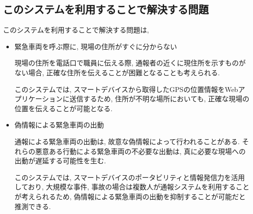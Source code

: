 \subsection{このシステムを利用することで解決する問題}
このシステムを利用することで解決する問題は,
\begin{itemize}
\item 緊急車両を呼ぶ際に, 現場の住所がすぐに分からない

現場の住所を電話口で職員に伝える際, 通報者の近くに現住所を示すものがない場合, 正確な住所を伝えることが困難となることも考えられる.

このシステムでは, スマートデバイスから取得したGPSの位置情報をWebアプリケーションに送信するため, 住所が不明な場所においても, 正確な現場の位置を伝えることが可能となる.

\item 偽情報による緊急車両の出動

通報による緊急車両の出動は, 故意な偽情報によって行われることがある.
それらの悪意ある行動による緊急車両の不必要な出動は, 真に必要な現場への出動が遅延する可能性を生む.

このシステムでは, スマートデバイスのポータビリティと情報発信力を活用しており, 大規模な事件, 事故の場合は複数人が通報システムを利用することが考えられるため, 偽情報による緊急車両の出動を抑制することが可能だと推測できる.
\end{itemize}

\section{}
\subsection{}
